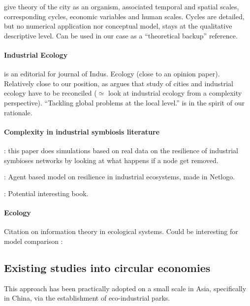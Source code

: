 \documentclass{article}
\begin{document}
\cite{olsen1982urban} give theory of the city as an organism, associated temporal and spatial scales, corresponding cycles, economic variables and human scales. Cycles are detailed, but no numerical application nor conceptual model, stays at the qualitative descriptive level. Can be used in our case as a “theoretical backup” reference.


\paragraph{Industrial Ecology}

\cite{bai2007industrial} is an editorial for journal of Indus. Ecology (close to an opinion paper). Relatively close to our position, as argues that study of cities and industrial ecology have to be reconciled ($\simeq$ look at industrial ecology from a complexity perspective). ``Tackling global problems at the local level.'' is in the spirit of our rationale.


\paragraph{Complexity in industrial symbiosis literature}

\cite{li2015resilience} : this paper does simulations based on real data on the resilience of industrial symbioses networks by looking at what happens if a node get removed.

\cite{zhu2013exploring} : Agent based model on resilience in industrial ecosystems, made in Netlogo.

\cite{may1973stability} : Potential interesting book.



\paragraph{Ecology}


Citation on information theory in ecological systems. Could be interesting for model comparison : \cite{ulanowicz1991ecosystem}




\subsection{Existing studies into circular economies}

This approach has been practically adopted on a small scale in Asia, specifically in China, via the establishment of eco-industrial parks. 
\end{document}
